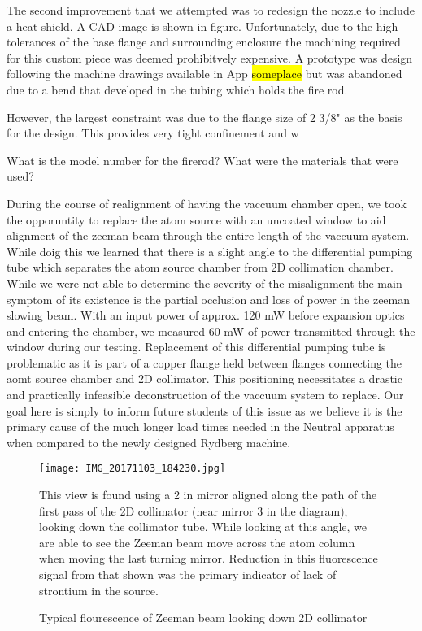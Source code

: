 The second improvement that we attempted was to redesign the nozzle to include a heat shield. A CAD image is shown in figure. Unfortunately, due to the high tolerances of the base flange and surrounding enclosure the machining required for this custom piece was deemed prohibitvely expensive. A prototype was design following the machine drawings available in App \hl{someplace} but was abandoned due to a bend that developed in the tubing which holds the fire rod. 

However, the largest constraint was due to the flange size of 2 3/8" as the basis for the design. This provides very tight confinement and w

What is the model number for the firerod? What were the materials that were used? 

During the course of realignment of having the vaccuum chamber open, we took the opporuntity to replace the atom source with an uncoated window to aid alignment of the zeeman beam through the entire length of the vaccuum system. While doig this we learned that there is a slight angle to the differential pumping tube which separates the atom source chamber from 2D collimation chamber. While we were not able to determine the severity of the misalignment the main symptom of its existence is the partial occlusion and loss of power in the zeeman slowing beam. With an input power of approx. 120 mW before expansion optics and entering the chamber, we measured 60 mW of power transmitted through the window during our testing. Replacement of this differential pumping tube is problematic as it is part of a copper flange held between flanges connecting the aomt source chamber and 2D collimator. This positioning necessitates a drastic and practically infeasible deconstruction of the vaccuum system to replace. Our goal here is simply to inform future students of this issue as we believe it is the primary cause of the much longer load times needed in the Neutral apparatus when compared to the newly designed Rydberg machine.


	\begin{figure}
		\centerline{
		\texttt{[image: IMG\_20171103\_184230.jpg]}}
		\caption{Typical flourescence of Zeeman beam looking down 2D collimator}{This view is found using a 2 in mirror aligned along the path of the first pass of the 2D collimator (near mirror 3 in the diagram), looking down the collimator tube. While looking at this angle, we are able to see the Zeeman beam move across the atom column when moving the last turning mirror. Reduction in this fluorescence signal from that shown was the primary indicator of lack of strontium in the source.}
		\label{fig:2d_coll_flourescence}
	\end{figure} 
	
